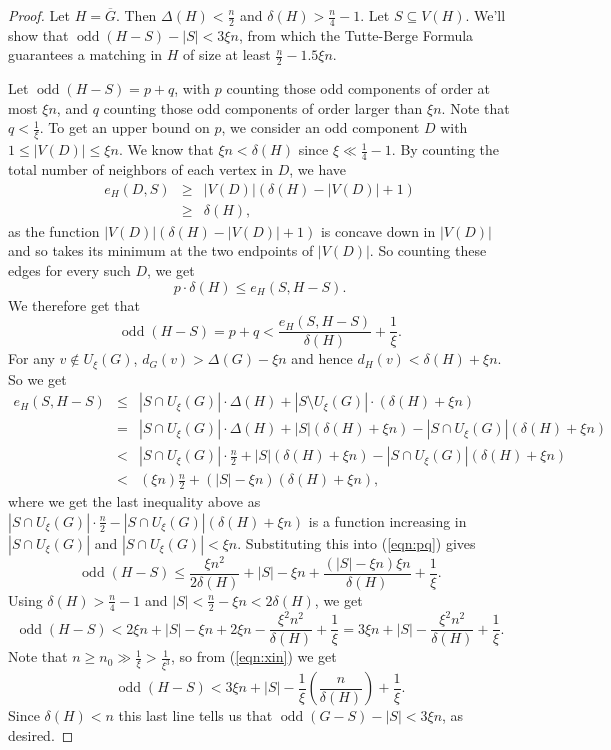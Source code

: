 \documentclass[11pt, oneside]{article}
\DeclareMathOperator{\odd}{odd}
\begin{document}
\begin{proof}
Let $H= \overline{G}$. Then  $\Delta(H) <  \frac{n}{2}$ and $\delta(H)>\frac{n}{4}-1$.
Let  $S\subseteq V(H)$. We'll show that $\odd(H-S)-|S|< 3\xi n$, from which the Tutte-Berge Formula guarantees a matching in $H$ of size at least $\frac{n}{2}-1.5\xi n$. 

Let $\odd(H-S)=p+q$, with $p$ counting those odd components of order at most $\xi n$, and $q$ counting those odd components of order larger than $\xi n$. Note that $q<\frac{1}{\xi}$. To get an upper bound on $p$, we consider an odd component $D$ with $ 1\le |V(D)| \le \xi n$. We know that $\xi n <\delta(H)$ since $\xi\ll\frac{1}{4}-1$. By counting the total number of neighbors of each vertex in $D$, we have 
\begin{eqnarray*}
    e_H(D,S) &\ge &|V(D)| (\delta(H)-|V(D)|+1)\\
    &\geq &  \delta(H), 
\end{eqnarray*}
 as the function $|V(D)| (\delta(H)-|V(D)|+1)$ is concave down in $|V(D)|$
 and so takes its minimum at the two endpoints of $|V(D)|$. So counting these edges for every such $D$, we get
 $$
  p \cdot \delta(H) \leq e_H(S, H-S).$$
We therefore get that
\begin{equation}\label{eqn:pq}
\odd(H-S)=p+q < \frac{e_H(S, H-S)}{\delta(H)}+\frac{1}{\xi}.
\end{equation}
For any $v\notin U_\xi(G)$, $d_G(v)> \Delta(G)-\xi n$ and hence $d_H(v)< \delta(H)+\xi n$. So we get
\begin{eqnarray*}
    e_H(S,H-S) &  \le    & |S\cap U_\xi(G)|\cdot \Delta(H)+|S\setminus U_\xi(G)|\cdot(\delta(H)+\xi n)  \\
    &=& |S\cap U_\xi(G)|\cdot \Delta(H) +|S|(\delta(H)+\xi n) -|S\cap U_\xi(G)|(\delta(H)+\xi n) \\
    &<& |S\cap U_\xi(G)|\cdot\tfrac{n}{2}+|S|(\delta(H)+\xi n) -|S\cap U_\xi(G)|(\delta(H)+\xi n) \\
    &<& (\xi n)\tfrac{n}{2} + (|S|-\xi n)(\delta(H)+\xi n), 
\end{eqnarray*}
where we get the last inequality above as $|S\cap U_\xi(G)|\cdot\tfrac{n}{2} -|S\cap U_\xi(G)|(\delta(H)+\xi n)$ is a function increasing in $|S\cap U_\xi(G)|$
and $|S\cap U_\xi(G)| < \xi n$. 
Substituting this into (\ref{eqn:pq}) gives
$$ \odd(H-S) \le  \frac{\xi n^2}{2\delta(H)}+|S|-\xi n + \frac{(|S|-\xi n) \xi n}{ \delta(H)}+\frac{1}{\xi}.$$
Using $\delta(H)> \tfrac{n}{4}-1$ and $|S| <\frac{n}{2}-\xi n <2\delta(H)$, we get
\begin{equation}\label{eqn:xin} \odd(H-S) < 2 \xi n +|S|-\xi n + 2\xi n - \frac{\xi^2 n^2}{\delta(H)} +\frac{1}{\xi} =3\xi n +|S| - \frac{\xi^2 n^2}{\delta(H)} +\frac{1}{\xi}.\end{equation}
Note that $n\geq n_0\gg \tfrac{1}{\xi} >\tfrac{1}{\xi^3}$, so from (\ref{eqn:xin}) we get
$$\odd(H-S) < 3\xi n +|S| - \frac{1}{\xi}\left(\frac{n}{\delta(H)}\right) +\frac{1}{\xi}.$$
Since $\delta(H)<n$ this last line tells us that $\odd(G-S)-|S|< 3\xi n$, as desired.
\end{proof}
\end{document}
